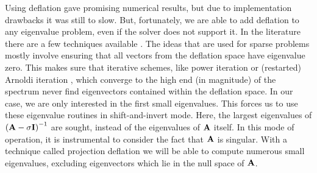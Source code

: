 Using deflation gave promising numerical results, but due to implementation drawbacks it was still to slow. But, fortunately, we are able to add deflation to any eigenvalue problem, even if the solver does not support it. In the literature there are a few techniques available \cite[section 4.2]{saad_numerical_2011}\cite{mackey_deflation_2008}. The ideas that are used for sparse problems mostly involve ensuring that all vectors from the deflation space have eigenvalue zero. This makes sure that iterative schemes, like power iteration or (restarted) Arnoldi iteration \cite{arnoldi_principle_1951}, which converge to the high end (in magnitude) of the spectrum never find eigenvectors contained within the deflation space. In our case, we are only interested in the first small eigenvalues. This forces us to use these eigenvalue routines in shift-and-invert mode. Here, the largest eigenvalues of $\left(\vb{A} - \sigma \vb{I}\right)^{-1}$ are sought, instead of the eigenvalues of $\vb{A}$ itself. In this mode of operation, it is instrumental to consider the fact that $\vb{A}$ is singular. With a technique called projection deflation we will be able to compute numerous small eigenvalues, excluding eigenvectors which lie in the null space of $\vb{A}$.



